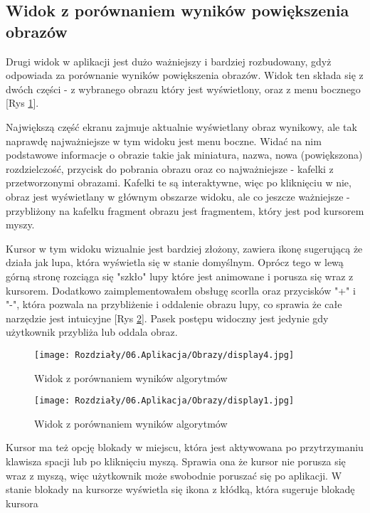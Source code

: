 \subsection*{Widok z porównaniem wyników powiększenia obrazów}

Drugi widok w aplikacji jest dużo ważniejszy i bardziej rozbudowany, gdyż odpowiada za porównanie wyników powiększenia obrazów. Widok ten składa się z dwóch części - z wybranego obrazu który jest wyświetlony, oraz z menu bocznego [Rys \ref{fig:image93}].

Największą część ekranu zajmuje aktualnie wyświetlany obraz wynikowy, ale tak naprawdę najważniejsze w tym widoku jest menu boczne. Widać na nim podstawowe informacje o obrazie takie jak miniatura, nazwa, nowa (powiększona) rozdzielczość, przycisk do pobrania obrazu oraz co najważniejsze - kafelki z przetworzonymi obrazami. Kafelki te są interaktywne, więc po kliknięciu w nie, obraz jest wyświetlany w głównym obszarze widoku, ale co jeszcze ważniejsze - przybliżony na kafelku fragment obrazu jest fragmentem, który jest pod kursorem myszy. 

Kursor w tym widoku wizualnie jest bardziej złożony, zawiera ikonę sugerującą że działa jak lupa, która wyświetla się w stanie domyślnym. Oprócz tego w lewą górną stronę rozciąga się "szkło" lupy które jest animowane i porusza się wraz z kursorem. 
Dodatkowo zaimplementowałem obsługę scorlla oraz przycisków "+" i "-", która pozwala na przybliżenie i oddalenie obrazu lupy, co sprawia że całe narzędzie jest intuicyjne [Rys \ref{fig:image94}]. Pasek postępu widoczny jest jedynie gdy użytkownik przybliża lub oddala obraz. 

\begin{figure}[H]
    \centering
    \texttt{[image: Rozdziały/06.Aplikacja/Obrazy/display4.jpg]}  
    \caption{Widok z porównaniem wyników algorytmów}
    \label{fig:image93}
\end{figure}

\begin{figure}[H]
    \centering
    \texttt{[image: Rozdziały/06.Aplikacja/Obrazy/display1.jpg]}  
    \caption{Widok z porównaniem wyników algorytmów}
    \label{fig:image94}
\end{figure}

\newpage
Kursor ma też opcję blokady w miejscu, która jest aktywowana po przytrzymaniu klawisza spacji lub po kliknięciu myszą. Sprawia ona że kursor nie porusza się wraz z myszą, więc użytkownik może swobodnie poruszać się po aplikacji. W stanie blokady na kursorze wyświetla się ikona z kłódką, która sugeruje blokadę kursora

